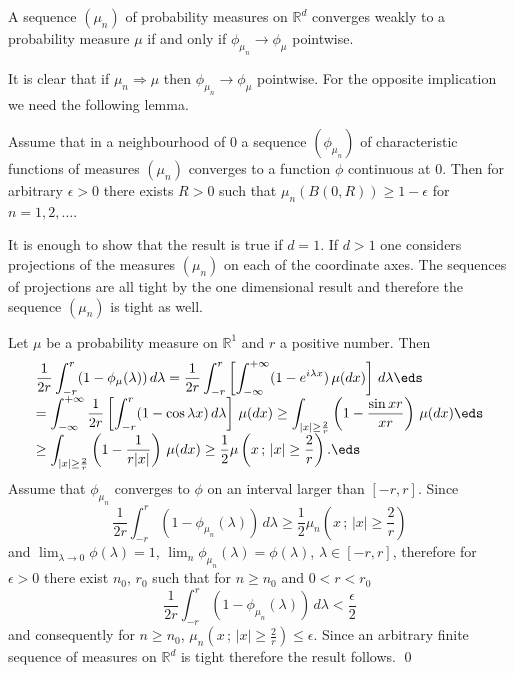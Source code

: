 \documentclass[preprint]{imsart}
\def\R{\mathbb R}
\def\ds{\displaystyle}
\begin{document}
{\begin{Theorem}
A sequence $(\mu_n)$ of probability measures
on $\R^d$ converges weakly to a probability
measure $\mu$ if and only if $\phi_{\mu_n}\to \phi_\mu$
pointwise.
\end{Theorem}



It is clear that if $\mu_n\Rightarrow\mu$ then
$\phi_{\mu_n}\to \phi_\mu$
pointwise. For the opposite implication we need
the following lemma.


\begin{Lemma}
Assume that in a neighbourhood of $0$ a sequence
$(\phi_{\mu_n})$  of characteristic functions of measures
 $(\mu_n)$  converges  to a function $\phi$ continuous at $0$.
Then for arbitrary $\epsilon >0$ there exists $R>0$ such that
$\mu_n(B(0,R))\geq 1-\epsilon$ for $n=1,2,\ldots$.
\end{Lemma}



It is enough to show that the result is true  if $d=1$. If $d>1$ one considers
projections of the measures $(\mu_n)$ on each of the coordinate axes. The
sequences
of projections are all tight by the one dimensional result and therefore
the sequence
$(\mu_n)$ is tight as well.

Let $\mu$ be a probability measure on $\R^1$ and $r$ a positive
number. Then
$$\begin{array}{l}\ds
\frac{1}{2r}
\int_{-r}^r (1-\phi_\mu(\lambda))\, d\lambda
=
\frac{1}{2r}
\int_{-r}^r
\left[
\int_{-\infty}^{+\infty}
 (1-e^{i\lambda x})\, \mu (dx)
\right]\,
d\lambda
\eds\\\ds
=
\int_{-\infty}^{+\infty}
\frac{1}{2r}
\left[
\int_{-r}^r
 (1-\cos \lambda x)\,  d\lambda
\right]\,  \mu (dx)
\geq
\int_{|x|\geq \frac{2}{r}}
\left( 1-\frac{\sin xr}{xr}\right) \,  \mu (dx)
\eds\\\ds
\geq
\int_{|x|\geq \frac{2}{r}}
\left( 1-\frac{1}{ r|x|}\right) \,  \mu (dx)
\geq
\frac{1}{2}\mu \left(x\, ;\, |x|\geq \frac{2}{r}\right).
\eds\end{array}
$$
Assume that $\phi_{\mu_n}$ converges to
$\phi$ on an interval larger than $[-r,r]$.
 Since
$$
\frac{1}{2r}
\int_{-r}^r (1-\phi_{\mu_n}(\lambda))\, d\lambda
\geq
\frac{1}{2}\mu_n \left(x\, ;\, |x|\geq \frac{2}{r}\right)
$$
and  $\lim_{\lambda \to 0}\phi (\lambda)=1$,
$\lim_n \phi_{\mu_n}(\lambda) =\phi (\lambda)$,
$\lambda\in [-r,r]$, therefore for $\epsilon >0$ there exist $n_0$,
$r_0$ such that for $n\geq n_0$ and $0<r<r_0$
$$
\frac{1}{2r}
\int_{-r}^r (1-\phi_{\mu_n}(\lambda))\, d\lambda
<\frac{\epsilon }{2}
$$
and consequently for $n\geq n_0$,
$\mu_n \left(x\, ;\, |x|\geq \frac{2}{r}\right)\leq
\epsilon $. Since an arbitrary finite sequence of
measures on $\R^d$ is tight therefore the result follows.
\qed



}
\end{document}
